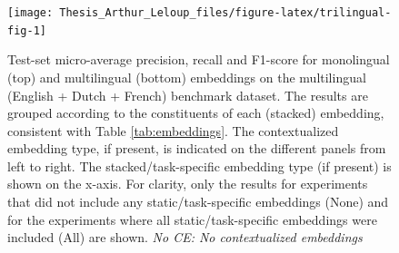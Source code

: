 \documentclass[12pt,a4paper,]{book}
\begin{document}
\begin{figure}

{\centering \texttt{[image: Thesis\_Arthur\_Leloup\_files/figure-latex/trilingual-fig-1]} 

}

\caption{Test-set micro-average precision, recall and F1-score for monolingual (top) and multilingual (bottom) embeddings on the multilingual (English + Dutch + French) benchmark dataset. The results are grouped according to the constituents of each (stacked) embedding, consistent with Table \ref{tab:embeddings}. The contextualized embedding type, if present, is indicated on the different panels from left to right. The stacked/task-specific embedding type (if present) is shown on the x-axis. For clarity, only the results for experiments that did not include any static/task-specific embeddings (None) and for the experiments where all static/task-specific embeddings were included (All) are shown. \emph{No CE: No contextualized embeddings}}\label{fig:trilingual-fig}
\end{figure}
\end{document}
